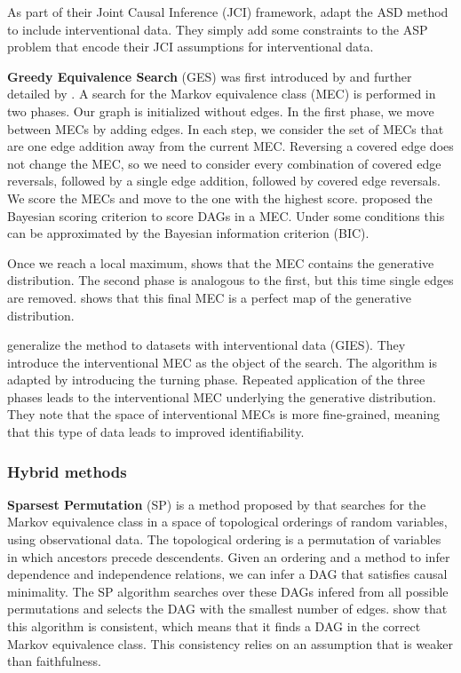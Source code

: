 As part of their Joint Causal Inference (JCI) framework, \citet{mooij2016joint} adapt the ASD method to include interventional data. They simply add some constraints to the ASP problem that encode their JCI assumptions for interventional data.

\textbf{Greedy Equivalence Search} (GES) was first introduced by \citet{meek1997graphical} and further detailed by \citet{chickering2002optimal}. A search for the Markov equivalence class (MEC) is performed in two phases. Our graph is initialized without edges. In the first phase, we move between MECs by adding edges. In each step, we consider the set of MECs that are one edge addition away from the current MEC. Reversing a covered edge does not change the MEC, so we need to consider every combination of covered edge reversals, followed by a single edge addition, followed by covered edge reversals. We score the MECs and move to the one with the highest score. \citet{meek1997graphical} proposed the Bayesian scoring criterion to score DAGs in a MEC. Under some conditions this can be approximated by the Bayesian information criterion (BIC). 

Once we reach a local maximum, \citet{chickering2002optimal} shows that the MEC contains the generative distribution. The second phase is analogous to the first, but this time single edges are removed. \citet{chickering2002optimal} shows that this final MEC is a perfect map of the generative distribution.

\citet{hauser2012characterization} generalize the method to datasets with interventional data (GIES). They introduce the interventional MEC as the object of the search. The algorithm is adapted by introducing the turning phase. Repeated application of the three phases leads to the interventional MEC underlying the generative distribution. They note that the space of interventional MECs is more fine-grained, meaning that this type of data leads to improved identifiability.


\subsubsection*{Hybrid methods}

\textbf{Sparsest Permutation} (SP) is a method proposed by \citet{raskutti2018learning} that searches for the Markov equivalence class in a space of topological orderings of random variables, using observational data. The topological ordering is a permutation of variables in which ancestors precede descendents. Given an ordering and a method to infer dependence and independence relations, we can infer a DAG that satisfies causal minimality. The SP algorithm searches over these DAGs infered from all possible permutations and selects the DAG with the smallest number of edges. \citet{raskutti2018learning} show that this algorithm is consistent, which means that it finds a DAG in the correct Markov equivalence class. This consistency relies on an assumption that is weaker than faithfulness. 

